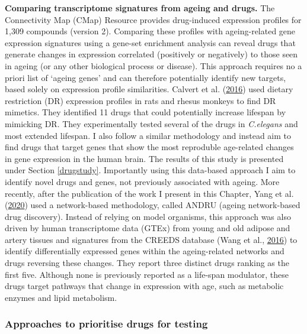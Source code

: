 \documentclass[12pt,twoside]{unicam}
\begin{document}
\textbf{Comparing transcriptome signatures from ageing and drugs.} The Connectivity Map (CMap) Resource provides drug-induced expression profiles for 1,309 compounds (version 2). Comparing these profiles with ageing-related gene expression signatures using a gene-set enrichment analysis can reveal drugs that generate changes in expression correlated (positively or negatively) to those seen in ageing (or any other biological process or disease). This approach requires no a priori list of `ageing genes' and can therefore potentially identify new targets, based solely on expression profile similarities. Calvert et al. (\protect\hyperlink{ref-Calvert2016}{2016}) used dietary restriction (DR) expression profiles in rats and rhesus monkeys to find DR mimetics. They identified 11 drugs that could potentially increase lifespan by mimicking DR. They experimentally tested several of the drugs in \emph{C.elegans} and most extended lifespan. I also follow a similar methodology and instead aim to find drugs that target genes that show the most reproduble age-related changes in gene expression in the human brain. The results of this study is presented under Section \ref{drugstudy}. Importantly using this data-based approach I aim to identify novel drugs and genes, not previously associated with ageing. More recently, after the publication of the work I present in this Chapter, Yang et al. (\protect\hyperlink{ref-Yang2018}{2020}) used a network-based methodology, called ANDRU (ageing network-based drug discovery). Instead of relying on model organisms, this approach was also driven by human transcriptome data (GTEx) from young and old adipose and artery tissues and signatures from the CREEDS database (Wang et al., \protect\hyperlink{ref-Wang2016}{2016}) to identify differentially expressed genes within the ageing-related networks and drugs reversing these changes. They report three distinct drugs ranking as the first five. Although none is previously reported as a life-span modulator, these drugs target pathways that change in expression with age, such as metabolic enzymes and lipid metabolism.

\hypertarget{approaches-to-prioritise-drugs-for-testing}{%
\subsubsection{Approaches to prioritise drugs for testing}\label{approaches-to-prioritise-drugs-for-testing}}
\end{document}
